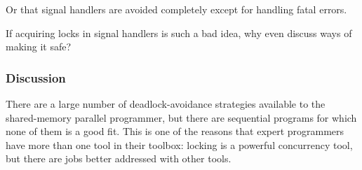 Or that signal handlers are avoided completely except for handling
fatal errors.

\QuickQuiz{}
	If acquiring locks in signal handlers is such a bad idea, why
	even discuss ways of making it safe?
 \QuickQuizEnd

\subsubsection{Discussion}
\label{sec:locking:Locking Hierarchy Discussion}

There are a large number of deadlock-avoidance strategies available to
the shared-memory parallel programmer, but there are sequential
programs for which none of them is a good fit.
This is one of the reasons that expert programmers have more than
one tool in their toolbox: locking is a powerful concurrency
tool, but there are jobs better addressed with other tools.

